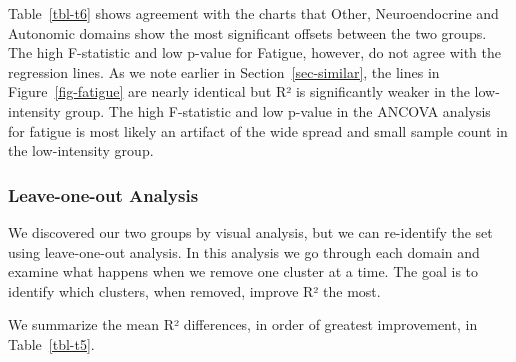 \documentclass[
  letterpaper,
  DIV=11,
  numbers=noendperiod]{scrartcl}
\begin{document}
Table~\ref{tbl-t6} shows agreement with the charts that Other,
Neuroendocrine and Autonomic domains show the most significant offsets
between the two groups. The high F-statistic and low p-value for
Fatigue, however, do not agree with the regression lines. As we note
earlier in Section~\ref{sec-similar}, the lines in
Figure~\ref{fig-fatigue} are nearly identical but R² is significantly
weaker in the low-intensity group. The high F-statistic and low p-value
in the ANCOVA analysis for fatigue is most likely an artifact of the
wide spread and small sample count in the low-intensity group.

\FloatBarrier

\subsubsection*{Leave-one-out Analysis}\label{sec-loo}

We discovered our two groups by visual analysis, but we can re-identify
the set using leave-one-out analysis. In this analysis we go through
each domain and examine what happens when we remove one cluster at a
time. The goal is to identify which clusters, when removed, improve R²
the most.

We summarize the mean R² differences, in order of greatest improvement,
in Table~\ref{tbl-t5}.

\begin{table}[h]

\caption{\label{tbl-t5}Leave-one-out Analysis}


\end{table}%
\end{document}
